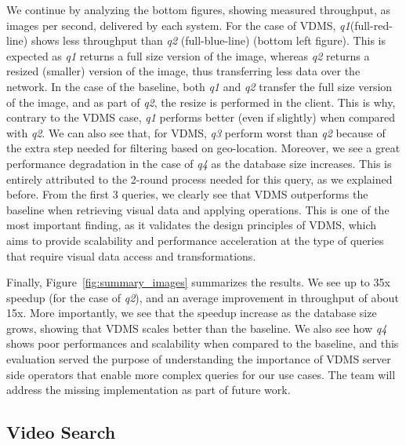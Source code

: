 We continue by analyzing the bottom figures, showing measured throughput,
as images per second, delivered by each system.
For the case of VDMS, \textit{q1}(full-red-line) shows less throughput
than \textit{q2} (full-blue-line) (bottom left figure).
This is expected as \textit{q1} returns a full size version of the image,
whereas \textit{q2} returns a resized (smaller) version of the image,
thus transferring less data over the network.
In the case of the baseline, both \textit{q1} and \textit{q2} transfer the full size
version of the image, and as part of \textit{q2}, the resize is performed in the client.
This is why, contrary to the VDMS case, \textit{q1} performs better (even if slightly)
when compared with \textit{q2}.
We can also see that, for VDMS, \textit{q3} perform worst than \textit{q2} because
of the extra step needed for filtering based on geo-location.
Moreover, we see a great performance degradation in the case of \textit{q4} as the
database size increases.
This is entirely attributed to the 2-round process needed for this query,
as we explained before.
From the first 3 queries, we clearly see that VDMS outperforms the baseline 
when retrieving visual data and applying operations.
This is one of the most important finding, as it validates the design principles
of VDMS, which aims to provide scalability and performance acceleration
at the type of queries that require visual data access and transformations.



Finally, Figure~\ref{fig:summary_images} summarizes the results.
We see up to 35x speedup (for the case of \textit{q2}),
and an average improvement in throughput of about 15x.
More importantly, we see that the speedup increase as the database size grows,
showing that VDMS scales better than the baseline.
We also see how \textit{q4} shows poor performances and scalability 
when compared to the baseline, and this evaluation served the 
purpose of understanding the importance of VDMS server side operators 
that enable more complex queries for our use cases.
The team will address the missing implementation as part of future work.




\subsection{Video Search}
\label{videos}

